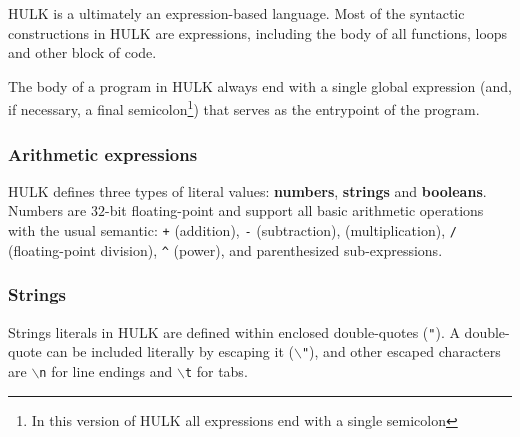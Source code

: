 \documentclass[a4paper, 12pt]{report}
\begin{document}
HULK is a ultimately an expression-based language. Most of the syntactic constructions in HULK are expressions,
including the body of all functions, loops and other block of code.

The body of a program in HULK always end with a single global expression (and, if necessary, a final semicolon\footnote{In this 
version of HULK all expressions end with a single semicolon}) that serves as the entrypoint of the program.

\subsubsection*{Arithmetic expressions}

HULK defines three types of literal values: {\bf numbers}, {\bf strings} and {\bf booleans}. Numbers are $32$-bit floating-point
and support all basic arithmetic operations with the usual semantic: {\tt +} (addition), {\tt -} (subtraction), {\tt *} (multiplication),
{\tt \slash} (floating-point division), {\tt \^{}} (power), and parenthesized sub-expressions. 

\subsubsection*{Strings}

Strings literals in HULK are defined within enclosed double-quotes ({\tt "}). A double-quote
can be included literally by escaping it ($\backslash${\tt "}), and other escaped characters are $\backslash${\tt n} for line endings and $\backslash${\tt t} for tabs.
\end{document}
